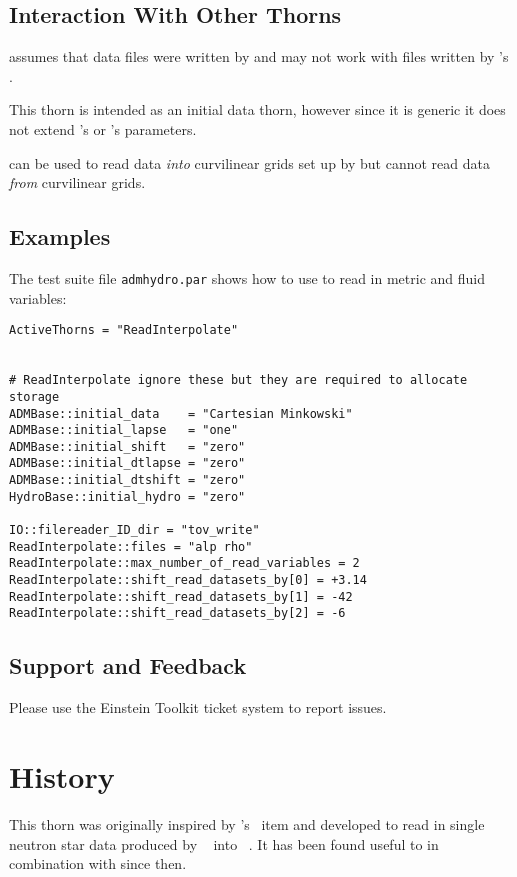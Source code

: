 \subsection{Interaction With Other Thorns}
 assumes that data files were written by
 and may not work with files written by 's
.

This thorn is intended as an initial data thorn, however since it is generic
it does not extend 's or 's 
parameters.

 can be used to read data \emph{into} curvilinear grids
set up by  but cannot read data \emph{from} curvilinear grids.

\subsection{Examples}
The test suite file \texttt{admhydro.par} shows how to use
 to read in metric and fluid variables:

\begin{verbatim}
ActiveThorns = "ReadInterpolate"


# ReadInterpolate ignore these but they are required to allocate storage
ADMBase::initial_data    = "Cartesian Minkowski"
ADMBase::initial_lapse   = "one"
ADMBase::initial_shift   = "zero"
ADMBase::initial_dtlapse = "zero"
ADMBase::initial_dtshift = "zero"
HydroBase::initial_hydro = "zero"

IO::filereader_ID_dir = "tov_write"
ReadInterpolate::files = "alp rho"
ReadInterpolate::max_number_of_read_variables = 2
ReadInterpolate::shift_read_datasets_by[0] = +3.14
ReadInterpolate::shift_read_datasets_by[1] = -42
ReadInterpolate::shift_read_datasets_by[2] = -6
\end{verbatim}

\subsection{Support and Feedback}
Please use the Einstein Toolkit ticket system to report issues.

\section{History}
This thorn was originally inspired by
's~\cite{EinsteinInitialData_ReadInterpolate_SpEC}
 item and developed to read in single neutron
star data produced by
~\cite{EinsteinInitialData_ReadInterpolate_THC} into
~\cite{EinsteinInitialData_ReadInterpolate_GRHydro}. It has been
found useful to in combination with  since then.

